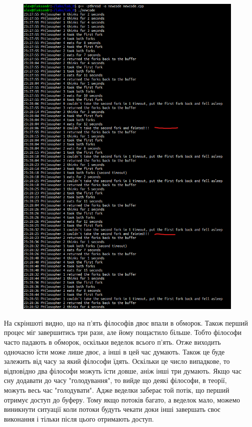 \documentclass[a4paper,12pt]{article}
\begin{document}
\newpage
    \begin{figure}[h!]
        \begin{minipage}[h]{1\linewidth}
            \centering
            \includegraphics[width=0.8\linewidth]{Prt sc/Figure_4.png}  
        \end{minipage}
    \end{figure}
    На скріншоті видно, що на п'ять філософів двоє впали в обморок. Також перший процес міг завершитись три рази, але йому пощастило більше.
    Тобто філософи часто падають в обморок, оскільки веделок всього п'ять. Отже виходить одночасно їсти може лише двоє, а інші в цей час думають.
    Також це буде залежить від часу за який філософи їдять. Оскільки це число випадкове, то відповідно два філософи можуть їсти довше, аніж інші три думають.
    Якщо час сну додавати до часу "голодування", то вийде що деякі філософи, в теорії, можуть весь час "голодувати". Адже веделки заберає той потік, що перший отримує доступ
    до буферу. Тому якщо потоків багато, а веделок мало, можемо виникнути ситуації коли потоки будуть чекати доки інші завершать своє виконання і тільки після цього отримають доступ.
\end{document}
